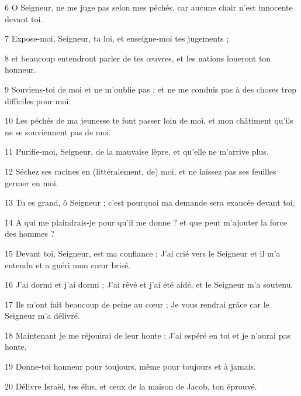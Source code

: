 \par 6 O Seigneur, ne me juge pas selon mes péchés, car aucune chair n'est innocente devant toi.

\par 7 Expose-moi, Seigneur, ta loi, et enseigne-moi tes jugements ;

\par 8 et beaucoup entendront parler de tes œuvres, et les nations loueront ton honneur.

\par 9 Souviens-toi de moi et ne m'oublie pas ; et ne me conduis pas à des choses trop difficiles pour moi.

\par 10 Les péchés de ma jeunesse te font passer loin de moi, et mon châtiment qu'ils ne se souviennent pas de moi.

\par 11 Purifie-moi, Seigneur, de la mauvaise lèpre, et qu'elle ne m'arrive plus.

\par 12 Séchez ses racines en (littéralement, de) moi, et ne laissez pas ses feuilles germer en moi.

\par 13 Tu es grand, ô Seigneur ; c'est pourquoi ma demande sera exaucée devant toi.

\par 14 A qui me plaindrais-je pour qu'il me donne ? et que peut m'ajouter la force des hommes ?

\par 15 Devant toi, Seigneur, est ma confiance ; J'ai crié vers le Seigneur et il m'a entendu et a guéri mon cœur brisé.

\par 16 J'ai dormi et j'ai dormi ; J'ai rêvé et j'ai été aidé, et le Seigneur m'a soutenu.

\par 17 Ils m'ont fait beaucoup de peine au cœur ; Je vous rendrai grâce car le Seigneur m'a délivré.

\par 18 Maintenant je me réjouirai de leur honte ; J'ai espéré en toi et je n'aurai pas honte.

\par 19 Donne-toi honneur pour toujours, même pour toujours et à jamais.

\par 20 Délivre Israël, tes élus, et ceux de la maison de Jacob, ton éprouvé.


